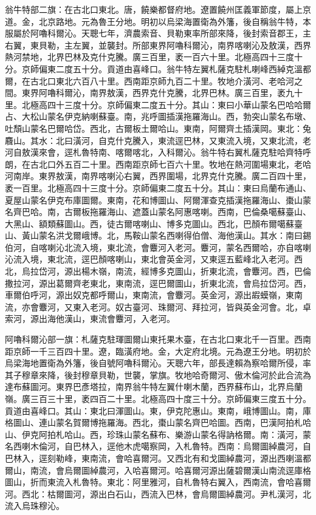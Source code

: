 \begin{pinyinscope}
翁牛特部二旗：在古北口東北。唐，饒樂都督府地。遼置饒州匡義軍節度，屬上京道。金，北京路地。元為魯王分地。明初以烏梁海置衛為外籓，後自稱翁牛特，本服屬於阿嚕科爾沁。天聰七年，濟農索音、貝勒東率所部來降，後封索音郡王，主右翼，東貝勒，主左翼，並襲封。所部東界阿嚕科爾沁，南界喀喇沁及敖漢，西界熱河禁地，北界巴林及克什克騰。廣三百里，袤一百六十里。北極高四十三度十分。京師偏東二度五十分。貢道由喜峰口。翁牛特左翼札薩克駐札喇峰西綽克溫都爾，在古北口東北六百八十里。西南距京師九百二十里。牧地介潢河、老哈河之間。東界阿嚕科爾沁，南界敖漢，西界克什克騰，北界巴林。廣三百里，袤九十里。北極高四十三度十分。京師偏東二度五十分。其山：東曰小華山蒙名巴哈哈爾占、大松山蒙名伊克納喇蘇臺。南，兆呼圖插漢拖羅海山。西，勃突山蒙名布墩、吐頹山蒙名巴爾哈岱。西北，古爾板土爾哈山。東南，阿爾齊土插漢岡。東北：兔麛山。其水：北曰潢河，自克什克騰入，東流逕巴林，又東流入境，又東北流，老河自敖漢來會，逕札魯特南、喀爾喀北，入科爾沁。翁牛特右翼札薩克駐哈齊特呼朗，在古北口外五百二十里。西南距京師七百六十里。牧地在熱河圍場東北，老哈河南岸。東界敖漢，南界喀喇沁右翼，西界圍場，北界克什克騰。廣二百四十里，袤一百里。北極高四十三度十分。京師偏東二度五十分。其山：東曰烏蘭布通山、夏屋山蒙名伊克布庫圖爾。東南，花和博圖山、阿爾渾查克插漢拖羅海山、棗山蒙名齊巴哈。南，古爾板拖羅海山、遮蓋山蒙名阿惠喀喇。西南，巴倫桑噶蘇臺山、大黑山、額類蘇圖山。西，徒古爾喀喇山、博多克圖山。西北，巴顏布爾噶蘇臺山、黃山蒙名洪戈爾峨博。北，馬鞍山蒙名西喇得伯僧、海他漢山。其水：南曰錫伯河，自喀喇沁北流入境，東北流，會麞河入老河。麞河，蒙名西爾哈，亦自喀喇沁流入境，東北流，逕巴顏喀喇山，東北會英金河，又東逕五藍峰北入老河。西北，烏拉岱河，源出楊木嶺，南流，經博多克圖山，折東北流，會麞河。西，巴倫撒拉河，源出葛爾齊老東北，東南流，逕巴爾圖山，折東北流，會烏拉岱河。西，車爾伯呼河，源出奴克都呼爾山，東南流，會麞河。英金河，源出嘏蟆嶺，東南流，亦會麞河，又東入老河。奴古臺河、珠爾河、拜拉河，皆與英金河會。北，卓索河，源出海他漢山，東流會麞河，入老河。

阿嚕科爾沁部一旗：札薩克駐琿圖爾山東托果木臺，在古北口東北千一百里。西南距京師一千三百四十里。遼，臨潢府地。金，大定府北境。元為遼王分地。明初於烏梁海地置衛為外籓，後自號阿嚕科爾沁。天聰六年，部長達賴為察哈爾所侵，率其子穆章來降，後封穆章貝勒，世襲，掌旗。牧地哈奇爾河、傲木倫河於此合流為達布蘇圖河。東界巴彥塔拉，南界翁牛特左翼什喇木蘭，西界蘇布山，北界烏蘭嶺。廣三百三十里，袤四百二十里。北極高四十度三十分。京師偏東三度五十分。貢道由喜峰口。其山：東北曰渾圖山。東，伊克陀惠山。東南，峨博圖山。南，庫格圖山、連山蒙名賀爾博拖羅海。西北，棗山蒙名齊巴哈圖。西南，巴漢阿拍札哈山、伊克阿拍札哈山。西，珍珠山蒙名蘇布、樂游山蒙名得訥格爾。南：潢河，蒙名西喇木倫河，自巴林入，逕他木虎噶察岡，入札魯特。西南：烏爾圖綽農河，自巴林入，逕刻勒峰，東南流，會哈喜爾河。又西北有和戈圖綽農河，源出西喇溫都爾山，南流，會烏爾圖綽農河，入哈喜爾河。哈喜爾河源出薩碧爾漢山南流逕庫格圖山，折而東流入札魯特。東北：阿里雅河，自札魯特右翼入，西南流，會哈喜爾河。西北：枯爾圖河，源出白石山，西流入巴林，會烏爾圖綽農河。尹札漢河，北流入烏珠穆沁。


\end{pinyinscope}
